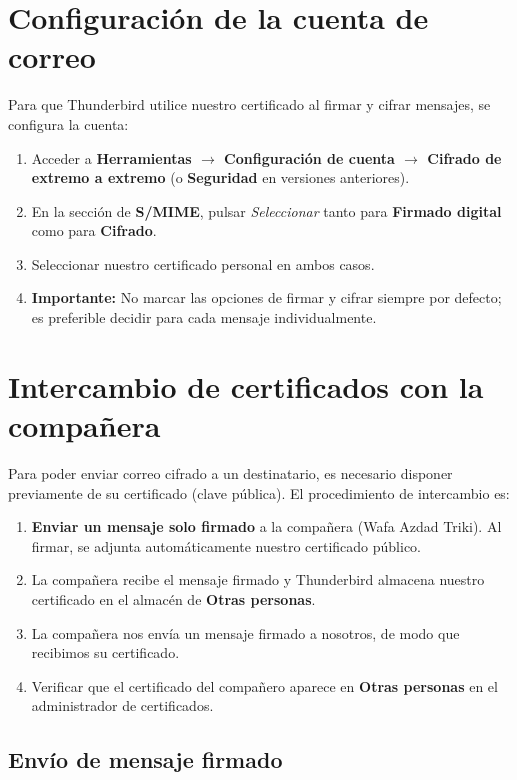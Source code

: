 \section{Configuración de la cuenta de correo}

Para que Thunderbird utilice nuestro certificado al firmar y cifrar mensajes, se configura la cuenta:

\begin{enumerate}
    \item Acceder a \textbf{Herramientas $\rightarrow$ Configuración de cuenta $\rightarrow$ Cifrado de extremo a extremo} (o \textbf{Seguridad} en versiones anteriores).
    \item En la sección de \textbf{S/MIME}, pulsar \textit{Seleccionar} tanto para \textbf{Firmado digital} como para \textbf{Cifrado}.
    \item Seleccionar nuestro certificado personal en ambos casos.
    \item \textbf{Importante:} No marcar las opciones de firmar y cifrar siempre por defecto; es preferible decidir para cada mensaje individualmente.
\end{enumerate}

\section{Intercambio de certificados con la compañera}

Para poder enviar correo cifrado a un destinatario, es necesario disponer previamente de su certificado (clave pública). El procedimiento de intercambio es:

\begin{enumerate}
    \item \textbf{Enviar un mensaje solo firmado} a la compañera (Wafa Azdad Triki). Al firmar, se adjunta automáticamente nuestro certificado público.
    \item La compañera recibe el mensaje firmado y Thunderbird almacena nuestro certificado en el almacén de \textbf{Otras personas}.
    \item La compañera nos envía un mensaje firmado a nosotros, de modo que recibimos su certificado.
    \item Verificar que el certificado del compañero aparece en \textbf{Otras personas} en el administrador de certificados.
\end{enumerate}

\subsection{Envío de mensaje firmado}

